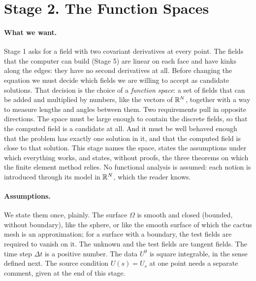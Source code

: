 \section{Stage 2. The Function Spaces}
\label{section:r1_spaces}

\paragraph{What we want.} Stage 1 asks for a field with two covariant derivatives at every point. The fields that the computer can build (Stage 5) are linear on each face and have kinks along the edges: they have no second derivatives at all. Before changing the equation we must decide which fields we are willing to accept as candidate solutions. That decision is the choice of a \emph{function space}: a set of fields that can be added and multiplied by numbers, like the vectors of $\mathbb{R}^N$, together with a way to measure lengths and angles between them. Two requirements pull in opposite directions. The space must be large enough to contain the discrete fields, so that the computed field is a candidate at all. And it must be well behaved enough that the problem has exactly one solution in it, and that the computed field is close to that solution. This stage names the space, states the assumptions under which everything works, and states, without proofs, the three theorems on which the finite element method relies. No functional analysis is assumed: each notion is introduced through its model in $\mathbb{R}^N$, which the reader knows.

\paragraph{Assumptions.} We state them once, plainly. The surface $\Omega$ is smooth and closed (bounded, without boundary), like the sphere, or like the smooth surface of which the cactus mesh is an approximation; for a surface with a boundary, the test fields are required to vanish on it. The unknown and the test fields are tangent fields. The time step $\Delta t$ is a positive number. The data $U^0$ is square integrable, in the sense defined next. The source condition $U(s) = U_s$ at one point needs a separate comment, given at the end of this stage.

